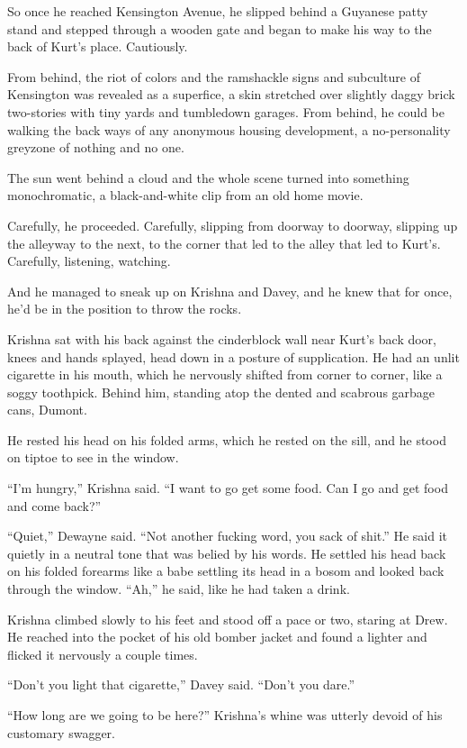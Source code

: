So once he reached Kensington Avenue, he slipped behind a Guyanese
patty stand and stepped through a wooden gate and began to make his
way to the back of Kurt's place.  Cautiously.

From behind, the riot of colors and the ramshackle signs and
subculture of Kensington was revealed as a superfice, a skin stretched
over slightly daggy brick two-stories with tiny yards and tumbledown
garages.  From behind, he could be walking the back ways of any
anonymous housing development, a no-personality greyzone of nothing
and no one.

The sun went behind a cloud and the whole scene turned into something
monochromatic, a black-and-white clip from an old home movie.

Carefully, he proceeded.  Carefully, slipping from doorway to doorway,
slipping up the alleyway to the next, to the corner that led to the
alley that led to Kurt's.  Carefully, listening, watching.

And he managed to sneak up on Krishna and Davey, and he knew that for
once, he'd be in the position to throw the rocks.

Krishna sat with his back against the cinderblock wall near Kurt's
back door, knees and hands splayed, head down in a posture of
supplication.  He had an unlit cigarette in his mouth, which he
nervously shifted from corner to corner, like a soggy toothpick. 
Behind him, standing atop the dented and scabrous garbage cans,
Dumont.

He rested his head on his folded arms, which he rested on the sill,
and he stood on tiptoe to see in the window.

``I'm hungry,'' Krishna said.  ``I want to go get some food.  Can I go
and get food and come back?''

``Quiet,'' Dewayne said.  ``Not another fucking word, you sack of
shit.'' He said it quietly in a neutral tone that was belied by his
words.  He settled his head back on his folded forearms like a babe
settling its head in a bosom and looked back through the window. 
``Ah,'' he said, like he had taken a drink.

Krishna climbed slowly to his feet and stood off a pace or two,
staring at Drew.  He reached into the pocket of his old bomber jacket
and found a lighter and flicked it nervously a couple times.

``Don't you light that cigarette,'' Davey said.  ``Don't you dare.''

``How long are we going to be here?'' Krishna's whine was utterly
devoid of his customary swagger.

